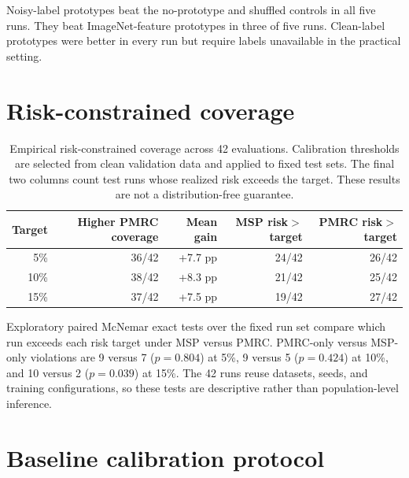 \documentclass[11pt,a4paper]{article}
\begin{document}
Noisy-label prototypes beat the no-prototype and shuffled controls in all five runs. They beat ImageNet-feature prototypes in three of five runs. Clean-label prototypes were better in every run but require labels unavailable in the practical setting.

\section{Risk-constrained coverage}

\begin{table}[H]
\centering
\caption{Empirical risk-constrained coverage across 42 evaluations. Calibration thresholds are selected from clean validation data and applied to fixed test sets. The final two columns count test runs whose realized risk exceeds the target. These results are not a distribution-free guarantee.}
\label{tab:risk-supp}
\footnotesize
\setlength{\tabcolsep}{3pt}
\begin{tabular}{@{}rrrrr@{}}
\toprule
Target & Higher PMRC coverage & Mean gain & MSP risk$>$target & PMRC risk$>$target \\
\midrule
5\% & 36/42 & +7.7 pp & 24/42 & 26/42 \\
10\% & 38/42 & +8.3 pp & 21/42 & 25/42 \\
15\% & 37/42 & +7.5 pp & 19/42 & 27/42 \\
\bottomrule
\end{tabular}
\end{table}

Exploratory paired McNemar exact tests over the fixed run set compare which run
exceeds each risk target under MSP versus PMRC. PMRC-only versus MSP-only
violations are 9 versus 7 ($p=0.804$) at 5\%, 9 versus 5 ($p=0.424$) at 10\%,
and 10 versus 2 ($p=0.039$) at 15\%. The 42 runs reuse datasets, seeds, and
training configurations, so these tests are descriptive rather than
population-level inference.

\section{Baseline calibration protocol}
\end{document}
